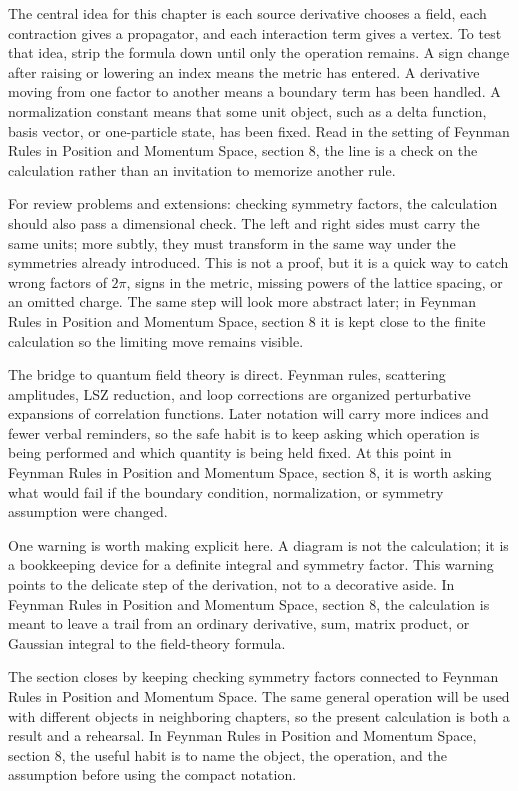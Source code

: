 The central idea for this chapter is each source derivative chooses a field, each contraction gives a propagator, and each interaction term gives a vertex.  To test that idea, strip the formula down until only the operation remains.  A sign change after raising or lowering an index means the metric has entered.  A derivative moving from one factor to another means a boundary term has been handled.  A normalization constant means that some unit object, such as a delta function, basis vector, or one-particle state, has been fixed.  Read in the setting of Feynman Rules in Position and Momentum Space, section 8, the line is a check on the calculation rather than an invitation to memorize another rule.

For review problems and extensions: checking symmetry factors, the calculation should also pass a dimensional check.  The left and right sides must carry the same units; more subtly, they must transform in the same way under the symmetries already introduced.  This is not a proof, but it is a quick way to catch wrong factors of \(2\pi\), signs in the metric, missing powers of the lattice spacing, or an omitted charge.  The same step will look more abstract later; in Feynman Rules in Position and Momentum Space, section 8 it is kept close to the finite calculation so the limiting move remains visible.

The bridge to quantum field theory is direct.  Feynman rules, scattering amplitudes, LSZ reduction, and loop corrections are organized perturbative expansions of correlation functions.  Later notation will carry more indices and fewer verbal reminders, so the safe habit is to keep asking which operation is being performed and which quantity is being held fixed.  At this point in Feynman Rules in Position and Momentum Space, section 8, it is worth asking what would fail if the boundary condition, normalization, or symmetry assumption were changed.

One warning is worth making explicit here.  A diagram is not the calculation; it is a bookkeeping device for a definite integral and symmetry factor.  This warning points to the delicate step of the derivation, not to a decorative aside.  In Feynman Rules in Position and Momentum Space, section 8, the calculation is meant to leave a trail from an ordinary derivative, sum, matrix product, or Gaussian integral to the field-theory formula.

The section closes by keeping checking symmetry factors connected to Feynman Rules in Position and Momentum Space.  The same general operation will be used with different objects in neighboring chapters, so the present calculation is both a result and a rehearsal.  In Feynman Rules in Position and Momentum Space, section 8, the useful habit is to name the object, the operation, and the assumption before using the compact notation.



